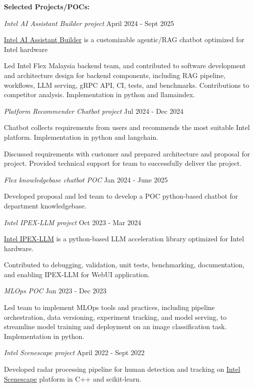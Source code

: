 \documentclass[a4paper,11pt]{article}
\newcommand{\customsubsection}[1]{
	\hspace{20pt}\textbf{#1}\\[-2pt]
	\vspace{4pt}
}
\newenvironment{resume_list}{
	\vspace{-7pt}
	\begin{itemize}[itemsep=-2px, parsep=1pt, leftmargin=30pt]
	}{
	\end{itemize}
}
\newcommand{\itemTitle}[1]{
	\item[] \hspace{-10pt}\textit{#1}\vspace{4pt}
}
\begin{document}
	\customsubsection{Selected Projects/POCs:}
	\begin{resume_list}
		\itemTitle{Intel AI Assistant Builder project}{April 2024 - Sept 2025}
		\item \href{https://aibuilder.intel.com/}{Intel AI Assistant Builder} is a customizable agentic/RAG chatbot optimized for Intel hardware
		\item Led Intel Flex Malaysia backend team, and contributed to software development and architecture design for backend components, including RAG pipeline, workflows, LLM serving, gRPC API, CI, tests, and benchmarks. Contributions to competitor analysis. Implementation in python and llamaindex. 
		\vspace{6pt}
		\itemTitle{Platform Recommender Chatbot project}{Jul 2024 - Dec 2024}
		\item Chatbot collects requirements from users and recommends the most suitable Intel platform. Implementation in python and langchain.
		\item Discussed requirements with customer and prepared architecture and proposal for project. Provided technical support for team to successfully deliver the project.
		\vspace{6pt}
		\itemTitle{Flex knowledgebase chatbot POC}{Jan 2024 - June 2025}
		\item Developed proposal and led team to develop a POC python-based chatbot for department knowledgebase.
		\vspace{6pt}
		\itemTitle{Intel IPEX-LLM project}{Oct 2023 - Mar 2024}
		\item \href{https://github.com/intel/ipex-llm}{Intel IPEX-LLM} is a python-based LLM acceleration library optimized for Intel hardware.
		\item Contributed to debugging, validation, unit tests, benchmarking, documentation, and enabling IPEX-LLM for WebUI application.
		\vspace{6pt}
		\itemTitle{MLOps POC}{Jan 2023 - Dec 2023}
		\item Led team to implement MLOps tools and practices, including pipeline orchestration, data versioning, experiment tracking, and model serving, to streamline model training and deployment on an image classification task. Implementation in python.
		\vspace{6pt}
		\itemTitle{Intel Scenescape project}{April 2022 - Sept 2022}
		\item Developed radar processing pipeline for human detection and tracking on \href{https://www.intel.com/content/www/us/en/developer/tools/scenescape/overview.html}{Intel Scenescape} platform in C++ and scikit-learn.
		\vspace{6pt}
	\end{resume_list}
	
\end{document}

